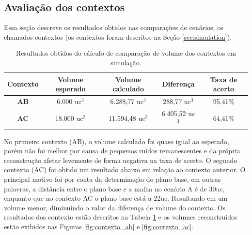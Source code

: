\subsection{Avaliação dos contextos}
\label{sec:avaliacao_contextos}

Essa seção descreve os resultados obtidos nas comparações de cenários, os chamados contextos (os contextos foram descritos na Seção \ref{sec:simulation}).

\begin{table}[H]
    \centering
    \caption{Resultados obtidos do cálculo de comparação de volume dos contextos em simulação.}
    \begin{tabular}{ccccc}
        \toprule
        \textbf{Contexto} & \textbf{Volume esperado} & \textbf{Volume calculado} & \textbf{Diferença} & \textbf{Taxa de acerto} \\ \midrule
        \textbf{AB} & 6.000 uc$^3$ & 6.288,77 uc$^3$ & 288,77 uc$^3$ & 95,41\% \\
        \textbf{AC} & 18.000 uc$^3$ & 11.594,48 uc$^3$ & 6.405,52 uc$^3$ & 64,41\% \\ \bottomrule
    \end{tabular}
    \label{tab:tabela_resultados_contextos_sim}
\end{table}

No primeiro contexto (AB), o volume calculado foi quase igual ao esperado, porém não foi melhor por causa de pequenos ruídos remanescentes e da própria reconstrução afetar levemente de forma negativa na taxa de acerto.
O segundo contexto (AC) foi obtido um resultado abaixo em relação ao contexto anterior.
O principal motivo foi por conta da determinação do plano base, em outras palavras, a distância entre o plano base e a malha no cenário A é de 30uc, enquanto que no contexto AC o plano base está a 22uc.
Resultando em um volume menor, diminuindo o valor da diferença de volume do contexto.
Os resultados dos contexto estão descritos na Tabela \ref{tab:tabela_resultados_contextos_sim} e os volumes reconstruídos estão exibidos nas Figuras \ref{fig:contexto_ab} e \ref{fig:contexto_ac}.


